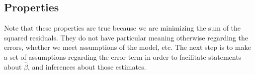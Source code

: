 \documentclass[
  letterpaper,
  DIV=11,
  numbers=noendperiod]{scrartcl}
\begin{document}
\subsection{Properties}\label{properties}

Note that these properties are true because we are minimizing the sum of
the squared residuals. They do not have particular meaning otherwise
regarding the errors, whether we meet assumptions of the model, etc. The
next step is to make a set of assumptions regarding the error term in
order to facilitate statements about \(\widehat{\beta}\), and inferences
about those estimates.
\end{document}

